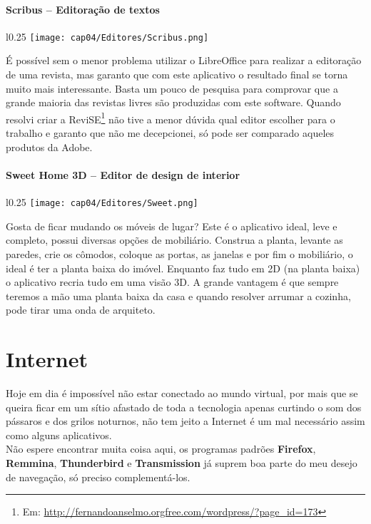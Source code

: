 \paragraph{Scribus – Editoração de textos}
\begin{minipage}{\linewidth}
 \vspace{5pt}
 \begin{wrapfigure}{l}{0.25\textwidth}
  \vspace{-\baselineskip}
  \texttt{[image: cap04/Editores/Scribus.png]} 
 \end{wrapfigure}
 É possível sem o menor problema utilizar o LibreOffice para realizar a editoração de uma revista, mas garanto que com este aplicativo o resultado final se torna muito mais interessante. Basta um pouco de pesquisa para comprovar que a grande maioria das revistas livres são produzidas com este software. Quando resolvi criar a ReviSE\footnote{Em: \url{http://fernandoanselmo.orgfree.com/wordpress/?page_id=173}} não tive a menor dúvida qual editor escolher para o trabalho e garanto que não me decepcionei, só pode ser comparado aqueles produtos da Adobe.
\end{minipage}

\paragraph{Sweet Home 3D – Editor de design de interior}
\begin{minipage}{\linewidth}
 \vspace{5pt}
 \begin{wrapfigure}{l}{0.25\textwidth}
  \vspace{-\baselineskip}
  \texttt{[image: cap04/Editores/Sweet.png]} 
 \end{wrapfigure}
 Gosta de ficar mudando os móveis de lugar? Este é o aplicativo ideal, leve e completo, possui diversas opções de mobiliário. Construa a planta, levante as paredes, crie os cômodos, coloque as portas, as janelas e por fim o mobiliário, o ideal é ter a planta baixa do imóvel. Enquanto faz tudo em 2D (na planta baixa) o aplicativo recria tudo em uma visão 3D. A grande vantagem é que sempre teremos a mão uma planta baixa da casa e quando resolver arrumar a cozinha, pode tirar uma onda de arquiteto.
\end{minipage}

\section{Internet}
Hoje em dia é impossível não estar conectado ao mundo virtual, por mais que se queira ficar em um sítio afastado de toda a tecnologia apenas curtindo o som dos pássaros e dos grilos noturnos, não tem jeito a Internet é um mal necessário assim como alguns aplicativos.\\[3mm]
Não espere encontrar muita coisa aqui, os programas padrões \textbf{Firefox}, \textbf{Remmina}, \textbf{Thunderbird} e \textbf{Transmission} já suprem boa parte do meu desejo de navegação, só preciso complementá-los.


